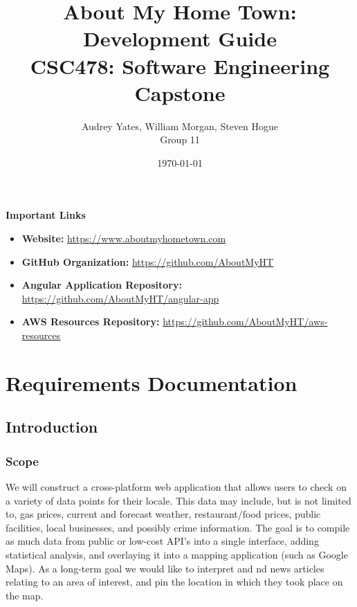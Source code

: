 \documentclass[12pt]{article}
\title{\bf About My Home Town: Development Guide \\ \large CSC478: Software Engineering Capstone}
\author{Audrey Yates, William Morgan, Steven Hogue \\ Group 11}
\date{\today}
\begin{document}
\maketitle

\textbf{Important Links}

\begin{itemize}
    \item \textbf{Website:} \href{https://www.aboutmyhometown.com}{https://www.aboutmyhometown.com}

    \item \textbf{GitHub Organization:} \href{https://github.com/AboutMyHT}{https://github.com/AboutMyHT}

    \item \textbf{Angular Application Repository:} \href{https://github.com/AboutMyHT/angular-app}{https://github.com/AboutMyHT/angular-app}

    \item \textbf{AWS Resources Repository:} \href{https://github.com/AboutMyHT/aws-resources}{https://github.com/AboutMyHT/aws-resources}
\end{itemize}

\tableofcontents

\newpage

\section{Requirements Documentation}\label{sec:scope}

\subsection{Introduction}

\subsubsection{Scope}

We will construct a cross-platform web application that allows users to check on a variety of data points for their locale. This data may include, but is not limited to, gas prices, current and forecast weather, restaurant/food prices, public facilities, local businesses, and possibly crime information. The goal is to compile as much data from public or low-cost API's into a single interface, adding statistical analysis, and overlaying it into a mapping application (such as Google Maps). As a long-term goal we would like to interpret and nd news articles relating to an area of interest, and pin the location in which they took place on the map.
\end{document}
